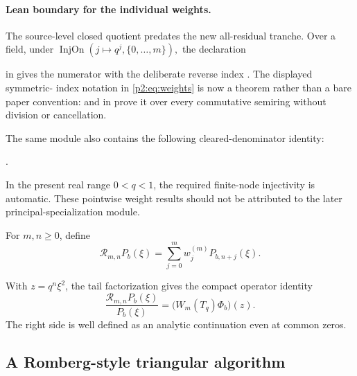 \documentclass[11pt,oneside]{article}
\numberwithin{equation}{section}
\theoremstyle{definition}
\theoremstyle{remark}
\begin{document}
\paragraph{Lean boundary for the individual weights.}
The source-level closed quotient predates the new all-residual tranche.  Over a field, under
\(
 \operatorname{InjOn}(j\mapsto q^j,\{0,\ldots,m\}),
\)
the declaration
\begin{center}
\end{center}
in  gives the numerator with the deliberate
reverse index .  The displayed symmetric-
index notation in \eqref{p2:eq:weights} is now a theorem rather than a bare
paper convention:  and
 in
 prove it over every commutative
semiring without division or cancellation.
\begin{samepage}
The same module also contains the following cleared-denominator identity:
\begin{center}
.
\end{center}
\end{samepage}
In the present
real range \(0<q<1\), the required finite-node injectivity is automatic.  These
pointwise weight results should not be attributed to the later
principal-specialization module.

\begin{definition}
For \(m,n\geq0\), define
\begin{equation}
 \mathcal R_{m,n}P_b(\xi)
 =\sum_{j=0}^m w_j^{(m)}P_{b,n+j}(\xi).
 \label{p2:eq:Rdef}
\end{equation}
\end{definition}

With \(z=q^n\xi^2\), the tail factorization gives the compact operator identity
\begin{equation}
 \frac{\mathcal R_{m,n}P_b(\xi)}{P_b(\xi)}
 =\bigl(W_m(T_q)\Phi_b\bigr)(z).
 \label{p2:eq:operatoridentity}
\end{equation}
The right side is well defined as an analytic continuation even at common zeros.

\subsection{A Romberg-style triangular algorithm}
\end{document}
